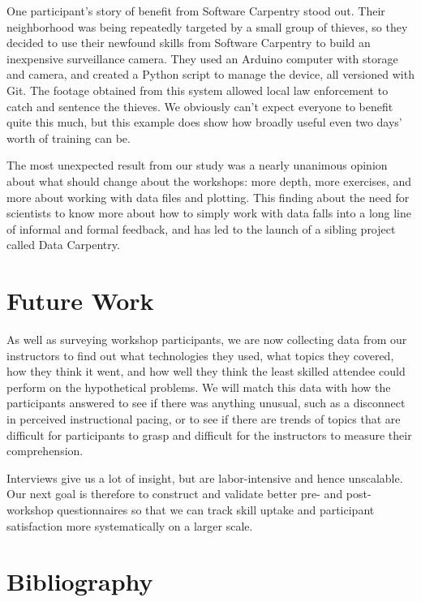 \documentclass[10pt, twocolumn]{article}
\begin{document}
	One participant's story of benefit from Software Carpentry stood out.
	Their neighborhood was being repeatedly targeted by a small group of thieves,
	so they decided to use their newfound skills from Software Carpentry to build an inexpensive surveillance camera.
	They used an Arduino computer with storage and camera,
	and created a Python script to manage the device,
	all versioned with Git.
	The footage obtained from this system allowed local law enforcement to catch and sentence the thieves.
	We obviously can't expect everyone to benefit quite this much,
	but this example does show how broadly useful even two days' worth of training can be.
	
	The most unexpected result from our study was a nearly unanimous opinion about what should change about the workshops:
	more depth,
	more exercises,
	and more about working with data files and plotting.
	This finding about the need for scientists to know more about how to simply work with data
	falls into a long line of informal and formal feedback,
	and has led to the launch of a sibling project called Data Carpentry.
	
	\section{Future Work}
	
	As well as surveying workshop participants,
	we are now collecting data from our instructors
	to find out what technologies they used,
	what topics they covered,
	how they think it went,
	and how well they think the least skilled attendee could perform on the hypothetical problems.
	We will match this data with how the participants answered to see if there was anything unusual,
	such as a disconnect in perceived instructional pacing,
	or to see if there are trends of topics that are difficult for participants to grasp
	and difficult for the instructors to measure their comprehension.
	
	Interviews give us a lot of insight,
	but are labor-intensive and hence unscalable.
	Our next goal is therefore to construct and validate better pre- and post-workshop questionnaires
	so that we can track skill uptake and participant satisfaction
	more systematically on a larger scale.
	
	\section{Bibliography}
	
	
	{\small
		
		
	}
	
\end{document}
